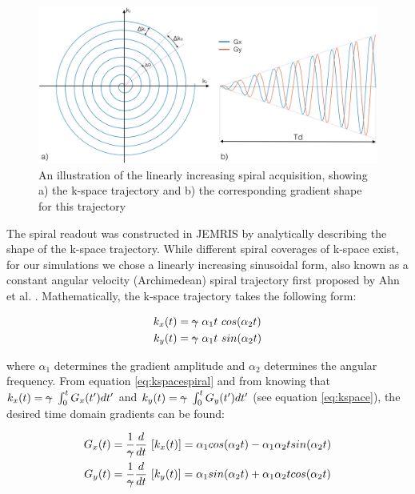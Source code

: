 \begin{figure}[ht]
    \centering
    \includegraphics[angle=0,width=1\textwidth, keepaspectratio]{images/mrf/spiralAcquisition}
    \caption{An illustration of the linearly increasing spiral acquisition, showing a) the k-space trajectory and b) the corresponding gradient shape for this trajectory}
    \label{fig:spiralAcquisition}
\end{figure}

The spiral readout was constructed in JEMRIS by analytically describing the shape of the k-space trajectory.
While different spiral coverages of k-space exist, for our simulations we chose a linearly increasing sinusoidal form, also known as a constant angular velocity (Archimedean) spiral trajectory first proposed by Ahn et al. \cite{Ahn1986}. 
Mathematically, the k-space trajectory takes the following form:

\begin{equation}\label{eq:kspacespiral}
    \begin{split}
        k_x(t) &= \text{\sout{$\gamma$}} \, \, \alpha_1 t \, \, cos (\alpha_2 t) \\
        k_y(t) &= \text{\sout{$\gamma$}}  \, \, \alpha_1 t  \, \, sin (\alpha_2 t) 
    \end{split}
\end{equation}

where $\alpha_1$ determines the gradient amplitude and $\alpha_2$ determines the angular frequency.
From equation \ref{eq:kspacespiral} and from knowing that $k_x(t) = \text{\sout{$\gamma$}} \, \, \int_0^t G_x(t') dt'$ and $k_y(t) = \text{\sout{$\gamma$}} \, \, \int_0^t G_y(t') dt'$ (see equation \ref{eq:kspace}), the desired time domain gradients can be found:

\begin{equation}
    \begin{split}
        G_x(t) &= \frac{1}{\text{\sout{$\gamma$}}} \frac{d}{dt} \,\, [k_x(t)] = \alpha_1 cos (\alpha_2 t) - \alpha_1 \alpha_2 t sin (\alpha_2 t) \\
        G_y(t) &= \frac{1}{\text{\sout{$\gamma$}}} \frac{d}{dt} \,\, [k_y(t)] = \alpha_1 sin (\alpha_2 t) + \alpha_1 \alpha_2 t cos (\alpha_2 t) 
    \end{split}
\end{equation}

